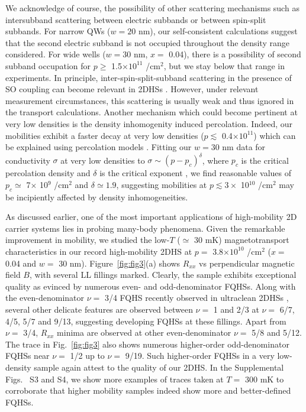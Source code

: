 \documentclass[reprint,amsmath,amssymb,aps,prl,nobibnotes,superscriptaddress]{revtex4-1}
\begin{document}
We acknowledge of course, the possibility of other scattering mechanisms such as intersubband scattering between electric subbands or between spin-split subbands. For narrow QWs ($w=20$ nm), our self-consistent calculations suggest that the second electric subband is not occupied throughout the density range considered. For wide wells ($w=30$ nm, $x=$ 0.04), there is a possibility of second subband occupation for $p\geq$ 1.5$\times10^{11}$  /cm$^{2}$, but we stay below that range in experiments. In principle, inter-spin-split-subband scattering in the presence of SO coupling can become relevant in 2DHSs \cite{Hwang2003}. However, under relevant measurement circumstances, this scattering is usually weak \cite{footnote2} and thus ignored in the transport calculations. Another mechanism which could become pertinent at very low densities is the density inhomogenity induced percolation. Indeed, our mobilities exhibit a faster decay at very low densities  ($p\lesssim$ 0.4$\times10^{11}$) which can be explained using percolation models \cite{Sojoto1990,Manfra2007}. Fitting our $w=30$ nm data for conductivity $\sigma$ at very low densities to $\sigma \sim (p - p_c)^{\delta}$, where $p_c$ is the critical percolation density and $\delta$ is the critical exponent \cite{Sojoto1990,Manfra2007}, we find reasonable values of $p_c\simeq$ 7$\times$ 10$^9$ /cm$^{2}$ and $\delta\simeq1.9$, suggesting mobilities at $p\lesssim3\times$ 10$^{10}$ /cm$^{2}$ may be incipiently affected by density inhomogeneities.


As discussed earlier, one of the most important applications of high-mobility 2D carrier systems lies in probing many-body phenomena. Given the remarkable improvement in mobility, we studied the low-$T$ ($\simeq$ 30 mK) magnetotransport characteristics in our record high-mobility 2DHS at  $p=$ 3.8$\times10^{10}$ /cm$^{2}$ ($x=$ 0.04 and $w=$ 30 nm). Figure~\ref{fig:fig3}(a) shows $R_{xx}$ vs perpendicular magnetic field $B$, with several LL fillings marked. Clearly, the sample exhibits exceptional quality as evinced by numerous even- and odd-denominator FQHSs. Along with the even-denominator $\nu=$ 3/4 FQHS recently observed in ultraclean 2DHSs \cite{Wang2022}, several other delicate features are observed between $\nu=$ 1 and 2/3 at $\nu=$ 6/7, 4/5, 5/7 and 9/13, suggesting developing FQHSs at these fillings. Apart from $\nu=$ 3/4, $R_{xx}$ minima are observed at other even-denominator $\nu=$ 5/8 and 5/12. The trace in Fig.~\ref{fig:fig3} also shows numerous higher-order odd-denominator FQHSs near $\nu=$ 1/2 up to  $\nu=$ 9/19. Such higher-order FQHSs in a very low-density sample again attest to the quality of our 2DHS. In the Supplemental Figs.~ S3 and S4, we show more examples of traces taken at $T=$ 300 mK to corroborate that higher mobility samples indeed show more and better-defined FQHSs.
\end{document}
